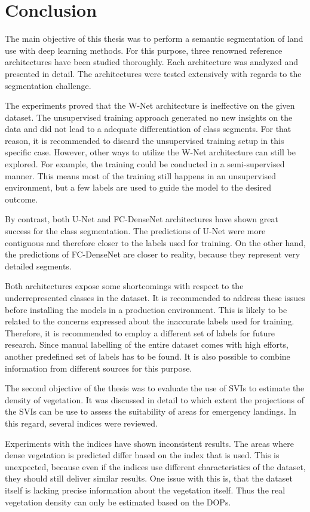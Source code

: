 \section{Conclusion}
The main objective of this thesis was to perform a semantic segmentation of land use with deep learning methods. For this purpose, three renowned reference architectures have been studied thoroughly. Each architecture was analyzed and presented in detail. The architectures were tested extensively with regards to the segmentation challenge.

The experiments proved that the W-Net architecture is ineffective on the given dataset. The unsupervised training approach generated no new insights on the data and did not lead to a adequate differentiation of class segments. For that reason, it is recommended to discard the unsupervised training setup in this specific case. However, other ways to utilize the W-Net architecture can still be explored. For example, the training could be conducted in a semi-supervised manner. This means most of the training still happens in an unsupervised environment, but a few labels are used to guide the model to the desired outcome.

By contrast, both U-Net and FC-DenseNet architectures have shown great success for the class segmentation. The predictions of U-Net were more contiguous and therefore closer to the labels used for training. On the other hand, the predictions of FC-DenseNet are closer to reality, because they represent very detailed segments. 

Both architectures expose some shortcomings with respect to the underrepresented classes in the dataset. It is recommended to address these issues before installing the models in a production environment. This is likely to be related to the concerns expressed about the inaccurate labels used for training. Therefore, it is recommended to employ a different set of labels for future research. Since manual labelling of the entire dataset comes with high efforts, another predefined set of labels has to be found. It is also possible to combine information from different sources for  this purpose.

The second objective of the thesis was to evaluate the use of SVIs to estimate the density of vegetation. It was discussed in detail to which extent the projections of the SVIs can be use to assess the suitability of areas for emergency landings. In this regard, several indices were reviewed.

Experiments with the indices have shown inconsistent results. The areas where dense vegetation is predicted differ based on the index that is used. This is unexpected, because even if the indices use different characteristics of the dataset, they should still deliver similar results. One issue with this is, that the dataset itself is lacking precise information about the vegetation itself. Thus the real vegetation density can only be estimated based on the DOPs.


